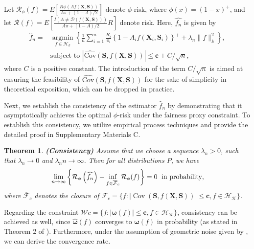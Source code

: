 \documentclass[12pt]{article}
\theoremstyle{plain}
\newtheorem{theorem}{Theorem}[section]
\theoremstyle{definition}
\theoremstyle{remark}
\begin{document}
Let $\mathcal{R}_\phi(f)=E\left[\frac{R\phi(Af(\boldsymbol{X}, \boldsymbol{S}))}{A \pi+(1-A) / 2} \right]$  denote $\phi$-risk, where $\phi(x)=(1-x)^{+}$, and let $\mathcal{R}(f)=E\left[\frac{I(A \neq \mathcal{D}(f(\boldsymbol{X}, \boldsymbol{S})))}{A \pi+(1-A) / 2} R\right]$  denote risk.
Here,  $\widehat{f_n}$  is given by
\begin{equation}\label{e20}
\begin{aligned}
\widehat{f}_n=&\underset{f \in \mathcal{H}_k}{\operatorname{argmin}}\left\{\frac{1}{n} \sum_{i=1}^n \frac{R_i}{\pi_i}\left\{1-A_i f\left(\boldsymbol{X}_i,\boldsymbol{S}_i\right)\right\}^{+}+\lambda_n\|f\|_k^2\right\},\\
&\text{subject to }|{\operatorname{\widehat{Cov}}\left(\boldsymbol{S}, f(\boldsymbol{X}, \boldsymbol{S})\right)}| \leq \boldsymbol{c}+C / \sqrt{n},
\nonumber
\end{aligned}
\end{equation}
where $C$ is a positive constant. The introduction of the term $C / \sqrt{n}$ is aimed at ensuring the feasibility of ${\operatorname{\widehat{Cov}}\left(\boldsymbol{S}, f(\boldsymbol{X}, \boldsymbol{S})\right)}$ for the sake of simplicity in theoretical exposition, which can be dropped in practice.


Next, we establish the consistency of the estimator $\widehat{f}_n$ by demonstrating that it asymptotically achieves the optimal $\phi$-risk under the fairness proxy constraint. To establish this consistency, we utilize empirical process techniques and provide the detailed proof in Supplementary Materials C.
\begin{theorem}\textbf{\upshape (Consistency)}
Assume that we choose a sequence $\lambda_n>0$, such that $\lambda_n \rightarrow 0$ and $\lambda_n n \rightarrow \infty$. Then for all distributions $P$, we have
$$
\\ \lim _{n \rightarrow \infty}\left\{\mathcal{R}_\phi\left(\widehat{f_n}\right)-\inf _{f \in \overline{\mathcal{F}}_c} \mathcal{R}_\phi(f)\right\}=0 \; \text{ in probability},
$$
where $\overline{\mathcal{F}}_c$ denotes the closure of $\mathcal{F}_c=\{f: |\operatorname{Cov}\left(\boldsymbol{S}, f(\boldsymbol{X}, \boldsymbol{S})\right)|\leq \boldsymbol{c} , f\in \mathcal{H}_{\mathcal{K}} \}$. \end{theorem}
Regarding the constraint $\mathcal{W}c=\{f: |\boldsymbol{\omega}(f)|\leq \boldsymbol{c} , f\in \mathcal{H}_{\mathcal{K}} \}$, consistency can be achieved as well, since $\boldsymbol{\widehat{\omega}}(f)$ converges to $\boldsymbol{\omega}(f)$ in probability (as stated in Theorem 2 of \cite{zhuliping2011}). Furthermore, under the assumption of geometric noise given by \cite{steinwart2007fast}, we can derive the convergence rate.
\end{document}
